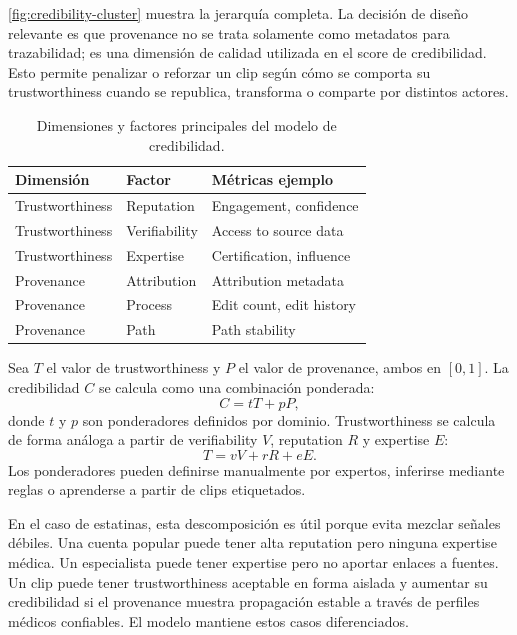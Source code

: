 \documentclass[sigconf, nonacm]{acmart}
\begin{document}
\autoref{fig:credibility-cluster} muestra la jerarqu\'ia completa. La decisi\'on de
dise\~no relevante es que provenance no se trata solamente como metadatos para
trazabilidad; es una dimensi\'on de calidad utilizada en el score de credibilidad.
Esto permite penalizar o reforzar un clip seg\'un c\'omo se comporta su
trustworthiness cuando se republica, transforma o comparte por distintos actores.

\begin{table}[t]
  \caption{Dimensiones y factores principales del modelo de credibilidad.}
  \label{tab:model}
  \begin{tabular}{lll}
    \toprule
    Dimensi\'on & Factor & M\'etricas ejemplo\\
    \midrule
    Trustworthiness & Reputation & Engagement, confidence\\
    Trustworthiness & Verifiability & Access to source data\\
    Trustworthiness & Expertise & Certification, influence\\
    Provenance & Attribution & Attribution metadata\\
    Provenance & Process & Edit count, edit history\\
    Provenance & Path & Path stability\\
    \bottomrule
  \end{tabular}
\end{table}

Sea $T$ el valor de trustworthiness y $P$ el valor de provenance, ambos en
$[0,1]$. La credibilidad $C$ se calcula como una combinaci\'on ponderada:
\begin{equation}
  C = tT + pP,
\end{equation}
donde $t$ y $p$ son ponderadores definidos por dominio. Trustworthiness se calcula
de forma an\'aloga a partir de verifiability $V$, reputation $R$ y expertise $E$:
\begin{equation}
  T = vV + rR + eE.
\end{equation}
Los ponderadores pueden definirse manualmente por expertos, inferirse mediante
reglas o aprenderse a partir de clips etiquetados.

En el caso de estatinas, esta descomposici\'on es \'util porque evita mezclar se\~nales
d\'ebiles. Una cuenta popular puede tener alta reputation pero ninguna expertise
m\'edica. Un especialista puede tener expertise pero no aportar enlaces a fuentes. Un
clip puede tener trustworthiness aceptable en forma aislada y aumentar su
credibilidad si el provenance muestra propagaci\'on estable a trav\'es de perfiles
m\'edicos confiables. El modelo mantiene estos casos diferenciados.
\end{document}

